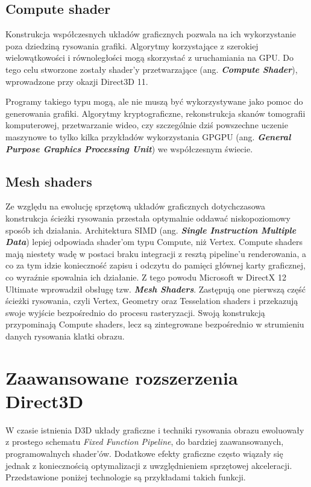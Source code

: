 \subsection{Compute shader}
Konstrukcja współczesnych układów graficznych pozwala na ich
wykorzystanie poza dziedziną rysowania grafiki. Algorytmy korzystające z
szerokiej wielowątkowości i równoległości mogą skorzystać z
uruchamiania na GPU. Do tego celu stworzone zostały shader'y
przetwarzające (ang. \emph{\textbf{Compute Shader}}), wprowadzone przy
okazji Direct3D 11.

Programy takiego typu mogą, ale nie muszą być wykorzystywane jako pomoc
do generowania grafiki. Algorytmy kryptograficzne, rekonstrukcja skanów
tomografii komputerowej, przetwarzanie wideo, czy szczególnie dziś
powszechne uczenie maszynowe to tylko kilka przykładów wykorzystania
GPGPU (ang. \emph{\textbf{General Purpose Graphics Processing Unit}}) we
współczesnym świecie.

\subsection{Mesh shaders}
Ze względu na ewolucję sprzętową układów graficznych dotychczasowa
konstrukcja ścieżki rysowania przestała optymalnie oddawać
niskopoziomowy sposób ich działania. Architektura SIMD (ang.
\emph{\textbf{Single Instruction Multiple Data}}) lepiej odpowiada
shader'om typu Compute, niż Vertex. Compute shaders mają niestety wadę w
postaci braku integracji z resztą pipeline'u renderowania, a co za tym
idzie konieczność zapisu i odczytu do pamięci głównej karty graficznej,
co wyraźnie spowalnia ich działanie. Z tego powodu Microsoft w DirectX 12 Ultimate wprowadził obsługę tzw.
\emph{\textbf{Mesh Shaders}}. Zastępują one pierwszą część ścieżki
rysowania, czyli Vertex, Geometry oraz Tesselation shaders i przekazują
swoje wyjście bezpośrednio do procesu rasteryzacji. Swoją konstrukcją
przypominają Compute shaders, lecz są zintegrowane bezpośrednio w
strumieniu danych rysowania klatki obrazu.

\section{Zaawansowane rozszerzenia Direct3D}

W czasie istnienia D3D układy graficzne i techniki rysowania obrazu
ewoluowały z prostego schematu \emph{Fixed Function Pipeline}, do
bardziej zaawansowanych, programowalnych shader'ów. Dodatkowe efekty
graficzne często wiązały się jednak z koniecznością optymalizacji z uwzględnieniem sprzętowej akceleracji. Przedstawione
poniżej technologie są przykładami takich funkcji.

